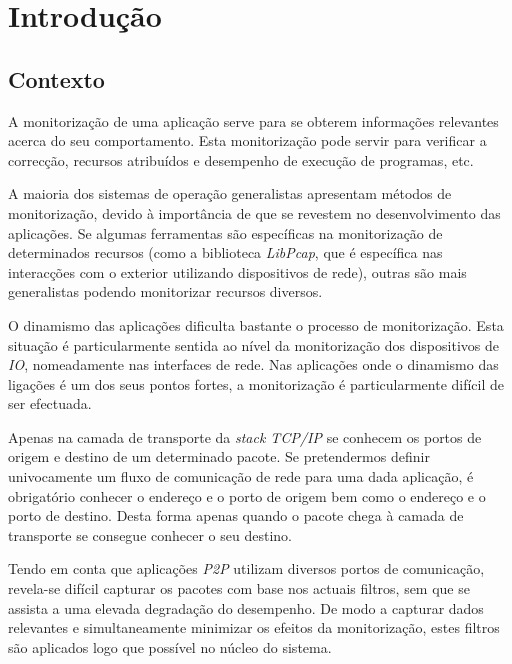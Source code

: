 \chapter{Introdução}\label{cap:introducao}

\section{Contexto}
\label{sec:intro_context}
A monitorização de uma aplicação serve para se obterem informações relevantes acerca do seu comportamento.
Esta monitorização pode servir para verificar a correcção, recursos atribuídos e desempenho de execução de programas, etc.

A maioria dos sistemas de operação generalistas apresentam métodos de monitorização, devido à importância de que se revestem no desenvolvimento das aplicações.
Se algumas ferramentas são específicas na monitorização de determinados recursos (como a biblioteca \textit{LibPcap}, que é específica nas interacções com o exterior utilizando dispositivos de rede), outras são mais generalistas podendo monitorizar recursos diversos.

O dinamismo das aplicações dificulta bastante o processo de monitorização.
Esta situação é particularmente sentida ao nível da monitorização dos dispositivos de \textit{IO}, nomeadamente nas interfaces de rede.
Nas aplicações onde o dinamismo das ligações é um dos seus pontos fortes, a monitorização é particularmente difícil de ser efectuada.

Apenas na camada de transporte da \textit{stack TCP/IP} se conhecem os portos de origem e destino de um determinado pacote.
Se pretendermos definir univocamente um fluxo de comunicação de rede para uma dada aplicação, é obrigatório conhecer o endereço e o porto de origem bem como o endereço e o porto de destino.
Desta forma apenas quando o pacote chega à camada de transporte se consegue conhecer o seu destino.

Tendo em conta que aplicações \textit{P2P} utilizam diversos portos de comunicação, revela-se difícil capturar os pacotes com base nos actuais filtros, sem que se assista a uma elevada degradação do desempenho.
De modo a capturar dados relevantes e simultaneamente minimizar os efeitos da monitorização, estes filtros são aplicados logo que possível no núcleo do sistema.

